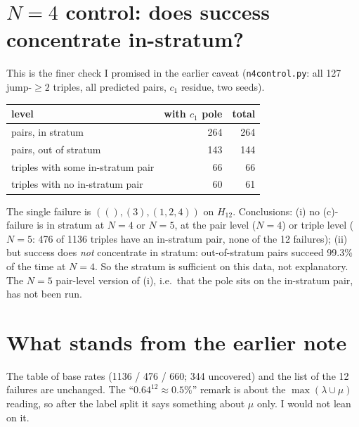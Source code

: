 \documentclass[10pt]{article}
\begin{document}
\section*{$N=4$ control: does success concentrate in-stratum?}
This is the finer check I promised in the earlier caveat (\texttt{n4control.py}: all 127 jump-$\ge2$ triples, all predicted pairs, $c_1$ residue, two seeds).
\begin{center}\small
\begin{tabular}{@{}lrr@{}}\toprule
level & with $c_1$ pole & total\\\midrule
pairs, in stratum & 264 & 264\\
pairs, out of stratum & 143 & 144\\
triples with some in-stratum pair & 66 & 66\\
triples with no in-stratum pair & 60 & 61\\\bottomrule
\end{tabular}
\end{center}
The single failure is $((),(3),(1,2,4))$ on $H_{12}$. Conclusions:
(i) no (c)-failure is in stratum at $N=4$ or $N=5$, at the pair level ($N=4$) or triple level ($N=5$: 476 of 1136 triples have an in-stratum pair, none of the 12 failures);
(ii) but success does \emph{not} concentrate in stratum: out-of-stratum pairs succeed 99.3\% of the time at $N=4$.
So the stratum is sufficient on this data, not explanatory. The $N=5$ pair-level version of (i), i.e.\ that the pole sits on the in-stratum pair, has not been run.

\section*{What stands from the earlier note}
The table of base rates (1136 / 476 / 660; 344 uncovered) and the list of the 12 failures are unchanged. The ``$0.64^{12}\approx0.5\%$'' remark is about the
$\max(\lambda\cup\mu)$ reading, so after the label split it says something about $\mu$ only. I would not lean on it.
\end{document}
